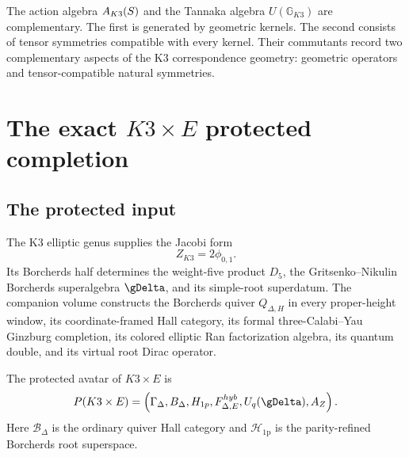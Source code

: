 The action algebra $A_{K3}(S)$ and the Tannaka algebra $U(\mathbb G_{K3})$ are complementary.  The first is generated by geometric kernels.  The second consists of tensor symmetries compatible with every kernel.  Their commutants record two complementary aspects of the K3 correspondence geometry: geometric operators and tensor-compatible natural symmetries.

\part{The exact \texorpdfstring{$K3\times E$}{K3 x E} protected completion}

\chapter{The protected input}
The K3 elliptic genus supplies the Jacobi form
\[
 Z_{K3}=2\phi_{0,1}.
\]
Its Borcherds half determines the weight-five product $D_5$, the Gritsenko--Nikulin Borcherds superalgebra $\gDelta$, and its simple-root superdatum.  The companion volume constructs the Borcherds quiver $Q_{\Delta,H}$ in every proper-height window, its coordinate-framed Hall category, its formal three-Calabi--Yau Ginzburg completion, its colored elliptic Ran factorization algebra, its quantum double, and its virtual root Dirac operator.

\begin{definition}
The protected avatar of $K3\times E$ is
\[
 \mathfrak P(K3\times E)=
 \left(
 \Gamma_\Delta,
 \mathcal B_\Delta,
 \mathcal H_{\mathrm{1p}},
 \mathcal F^{\mathrm{hyb}}_{\Delta,E},
 \widehat U_q(\gDelta),
 \mathbb A_Z
 \right).
\]
Here $\mathcal B_\Delta$ is the ordinary quiver Hall category and $\mathcal H_{\mathrm{1p}}$ is the parity-refined Borcherds root superspace.
\end{definition}

